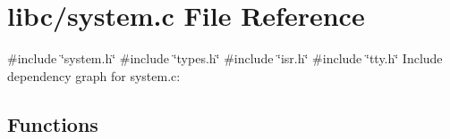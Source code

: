 \hypertarget{a00119}{}\section{libc/system.c File Reference}
\label{a00119}
{\ttfamily \#include \char`\"{}system.\+h\char`\"{}}\newline
{\ttfamily \#include \char`\"{}types.\+h\char`\"{}}\newline
{\ttfamily \#include \char`\"{}isr.\+h\char`\"{}}\newline
{\ttfamily \#include \char`\"{}tty.\+h\char`\"{}}\newline
Include dependency graph for system.\+c\+:
\subsection*{Functions}
